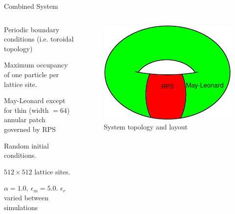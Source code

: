 \documentclass[aspectratio=169]{beamer}
\begin{document}
    \begin{frame}[t]{Combined System}
        \begin{columns}
            \begin{column}{0.5\textwidth}
                \begin{itemize}
                    \small{
                    \item Periodic boundary conditions (i.e. toroidal topology)
                    \item Maximum occupancy of one particle per lattice site.
                    \item May-Leonard except for thin (width $= 64 $) annular patch governed by RPS
                    \item Random initial conditions.
                    \item $ 512 \times 512 $ lattice sites.
                    \item $ \alpha = 1.0, \ \epsilon_m = 5.0 $. $ \epsilon_r $ varied between simulations
                    }
                \end{itemize}
            \end{column}
            \begin{column}{0.5\textwidth}
                \begin{figure}[h]
                    \centering
                    \includegraphics[width=\linewidth]{images/Model_Illustration.png}
                    \caption{System topology and layout}
                    \label{fig:plane_wave_2}
                \end{figure}
            \end{column}
        \end{columns}
    \end{frame}
\end{document}
